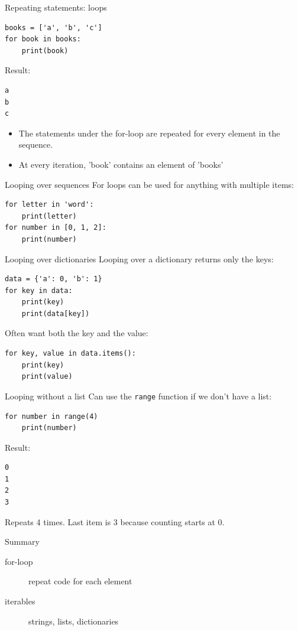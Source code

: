 \documentclass[aspectratio=169,usenames,dvipsnames]{beamer}
\begin{document}
\begin{frame}[fragile]{Repeating statements: loops}
\begin{lstlisting}
books = ['a', 'b', 'c']
for book in books:
    print(book)
\end{lstlisting}
Result:
\begin{lstlisting}
a
b
c
\end{lstlisting}

\begin{itemize}
\item The statements under the for-loop are repeated
    for every element in the sequence.
\item At every iteration, 'book' contains an element of 'books'
\end{itemize}
\end{frame}

\begin{frame}[fragile]{Looping over sequences}
For loops can be used for anything with multiple items:
\begin{lstlisting}
for letter in 'word':
    print(letter)
for number in [0, 1, 2]:
    print(number)
\end{lstlisting}
\end{frame}

\begin{frame}[fragile]{Looping over dictionaries}
Looping over a dictionary returns only the keys:
\begin{lstlisting}
data = {'a': 0, 'b': 1}
for key in data:
    print(key)
    print(data[key])
\end{lstlisting}

\pause
Often want both the key and the value:
\begin{lstlisting}
for key, value in data.items():
    print(key)
    print(value)
\end{lstlisting}
\end{frame}


\begin{frame}[fragile]{Looping without a list}
Can use the \texttt{range} function if we don't have a list:
\begin{lstlisting}
for number in range(4)
    print(number)
\end{lstlisting}

Result:
\begin{lstlisting}
0
1
2
3
\end{lstlisting}

Repeats 4 times. Last item is 3 because counting starts at 0.
\end{frame}

\begin{frame}{Summary}
    \begin{description}
        \item[for-loop] repeat code for each element
        \item[iterables] strings, lists, dictionaries
    \end{description}
\end{frame}
\end{document}
